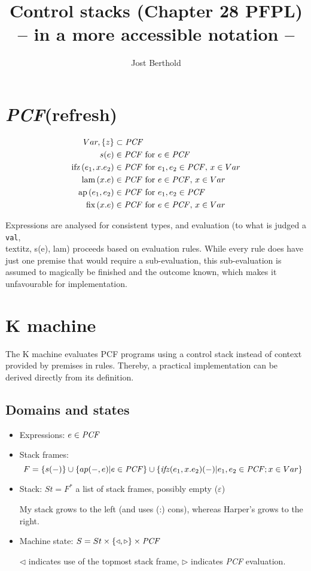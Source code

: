 \documentclass[12pt,a4paper]{article}
\author{Jost Berthold}
\title{Control stacks (Chapter 28 PFPL)\\
       {\small -- in a more accessible notation --}
}
\begin{document}

\newcommand{\PCF}{{\it PCF}\xspace}

\section*{\PCF (refresh)}

\begin{align*}
 Var, \{z\} & \subset \PCF\\
s(e) & \in \PCF \mbox{ for } e \in \PCF\\
\mbox{ifz}\,(e_1, x.e_2) &\in \PCF \mbox{ for } e_1, e_2 \in \PCF,\, x\in Var\\
\mbox{lam}\,(x.e) &\in \PCF \mbox{ for } e \in \PCF,\, x\in Var\\
\mbox{ap}\,(e_1,e_2) &\in \PCF \mbox{ for } e_1, e_2 \in \PCF\\
\mbox{fix}\,(x.e) &\in \PCF \mbox{ for } e \in \PCF,\, x\in Var\\
\end{align*}

Expressions are analysed for consistent types, and evaluation (to what is 
judged a \texttt{val}, \\textit{z, s(e), lam}) proceeds based on evaluation
rules. While every rule does have just one premise that would require
a sub-evaluation, this sub-evaluation is assumed to magically be finished and
the outcome known, which makes it unfavourable for implementation. 

\section*{K machine}

The K machine evaluates PCF programs using a control stack instead of
context provided by premises in rules. Thereby, a practical implementation
can be derived directly from its definition.

\subsection*{Domains and states}

\begin{itemize}
\item Expressions: $e \in \PCF$
\item Stack frames: $$ F = \{ s(-)\} \cup \{ ap(-, e) | e \in \PCF \}
                     \cup \{ {\it ifz}(e_1, x.e_2)(-) | e_1, e_2 \in \PCF; x \in Var \} $$
\item Stack: $St = F^*$ a list of stack frames, possibly empty ($\varepsilon$)

    My stack grows to the left (and uses (:) cons), whereas Harper's grows to the right.

\item Machine state: $ S = St \times \{ \triangleleft, \triangleright\} \times \PCF $ 

    $\triangleleft$ indicates use of the topmost stack frame,
    $\triangleright$ indicates \PCF evaluation.
\end{itemize}
\end{document}
